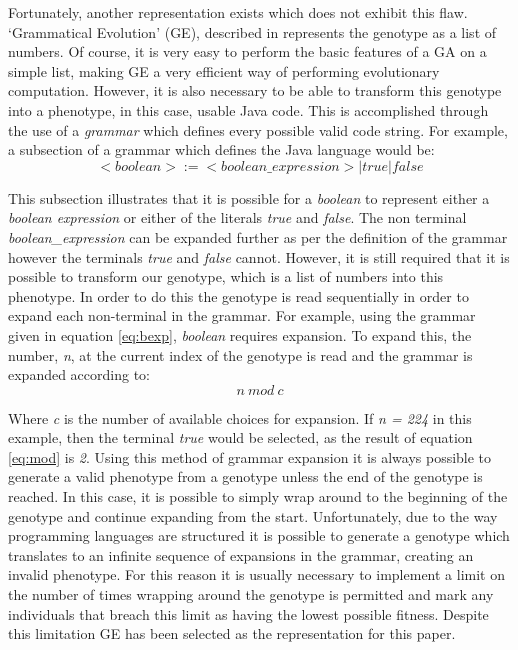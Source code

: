 \documentclass[a4paper, 12pt]{article}
\begin{document}
Fortunately, another representation exists which does not exhibit this flaw. `Grammatical Evolution' (GE), described in \cite{ryan_grammatical_1998} represents the genotype as a list of numbers. Of course, it is very easy to perform the basic features of a GA on a simple list, making GE a very efficient way of performing evolutionary computation. However, it is also necessary to be able to transform this genotype into a phenotype, in this case, usable Java code. This is accomplished through the use of a \textit{grammar} which defines every possible valid code string. For example, a subsection of a grammar which defines the Java language would be:
\begin{equation} \label{eq:bexp}
<boolean> := <boolean\_expression>| true | false
\end{equation}

This subsection illustrates that it is possible for a \textit{boolean} to represent either a \textit{boolean expression} or either of the literals \textit{true} and \textit{false}. The non terminal \textit{boolean\_expression} can be expanded further as per the definition of the grammar however the terminals \textit{true} and \textit{false} cannot. However, it is still required that it is possible to transform our genotype, which is a list of numbers into this phenotype. In order to do this the genotype is read sequentially in order to expand each non-terminal in the grammar. For example, using the grammar given in equation \ref{eq:bexp}, \textit{boolean} requires expansion. To expand this, the number, \textit{n}, at the current index of the genotype is read and the grammar is expanded according to:
\begin{equation} \label{eq:mod}
n\ mod\ c
\end{equation}

Where \textit{c} is the number of available choices for expansion. If \textit{n = 224} in this example, then the terminal \textit{true} would be selected, as the result of equation \ref{eq:mod} is \textit{2}. Using this method of grammar expansion it is always possible to generate a valid phenotype from a genotype unless the end of the genotype is reached. In this case, it is possible to simply wrap around to the beginning of the genotype and continue expanding from the start. Unfortunately, due to the way programming languages are structured it is possible to generate a genotype which translates to an infinite sequence of expansions in the grammar, creating an invalid phenotype. For this reason it is usually necessary to implement a limit on the number of times wrapping around the genotype is permitted and mark any individuals that breach this limit as having the lowest possible fitness. Despite this limitation GE has been selected as the representation for this paper.
\end{document}
